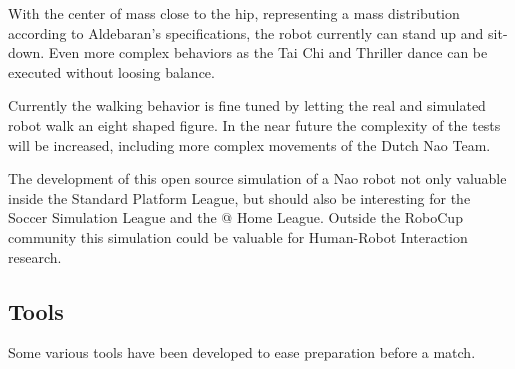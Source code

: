 \documentclass[11pt,a4paper,oneside]{article}
\begin{document}
With the center of mass close to the hip, representing a mass distribution according to Aldebaran's specifications, the robot currently can stand up and sit-down. Even more complex behaviors as the Tai Chi and Thriller dance can be executed without loosing balance.

Currently the walking behavior is fine tuned by letting the real and simulated robot walk an eight shaped figure. In the near future the complexity of the tests will be increased, including more complex movements of the Dutch Nao Team.

The development of this open source simulation of a Nao robot not only valuable inside the Standard Platform League, but should also be interesting for the Soccer Simulation League and the @ Home League. Outside the RoboCup community this simulation could be valuable for Human-Robot Interaction research.

\subsection{Tools}
Some various tools have been developed to ease preparation before a match. 
\end{document}
